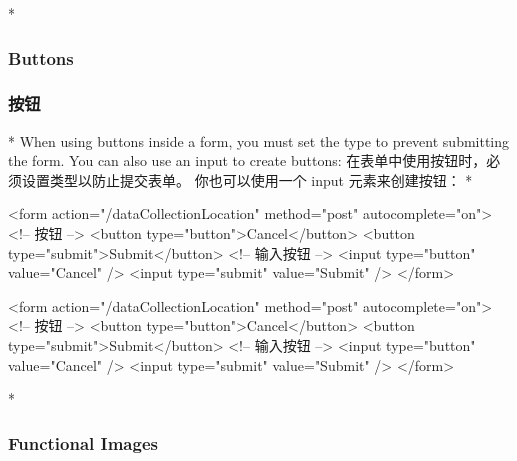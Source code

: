 \begin{paracol}{2} 
 
\switchcolumn[0]*%
\subsubsection{Buttons}
\switchcolumn
\subsubsection{按钮}
\switchcolumn[0]*%
When using buttons inside a form, you must set the type to prevent
submitting the form. You can also use an input to create buttons:
\switchcolumn
在表单中使用按钮时，必须设置类型以防止提交表单。 你也可以使用一个 input
元素来创建按钮：
\switchcolumn[0]*%
\begin{codeHtml}
<form action="/dataCollectionLocation" method="post" autocomplete="on">
  <!-- 按钮 -->
  <button type="button">Cancel</button>
  <button type="submit">Submit</button>
  <!-- 输入按钮 -->
  <input type="button" value="Cancel" />
  <input type="submit" value="Submit" />
</form>
\end{codeHtml}
\switchcolumn
\begin{codeHtml}
<form action="/dataCollectionLocation" method="post" autocomplete="on">
  <!-- 按钮 -->
  <button type="button">Cancel</button>
  <button type="submit">Submit</button>
  <!-- 输入按钮 -->
  <input type="button" value="Cancel" />
  <input type="submit" value="Submit" />
</form>
\end{codeHtml}
\switchcolumn[0]*%
\subsubsection{Functional Images}
\switchcolumn

\end{paracol}
